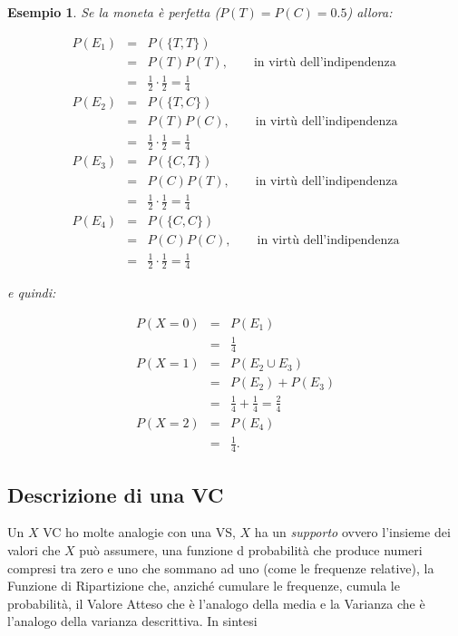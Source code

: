 \documentclass[
  11pt,
]{book}
\theoremstyle{mytheoremstyle}
\theoremstyle{mydefstyle}
\newtheorem{example}{{Esempio}}[section]
\begin{document}
\begin{example}
Se la moneta è perfetta (\(P(T)=P(C)=0.5\)) allora:

\begin{eqnarray*} 
P(E_1) &=& P(\{T,T\}) \\ 
    &=& P(T)P(T), \qquad \text{in virtù dell'indipendenza}\\
    &=& \frac 12 \cdot \frac 12  = \frac 14 \\
P(E_2)  &=& P(\{T,C\})\\
    &=& P(T)P(C), \qquad \text{in virtù dell'indipendenza}\\
    &=& \frac 12 \cdot \frac 12  = \frac 14 \\
P(E_3)  &=& P(\{C,T\})\\
    &=& P(C)P(T), \qquad \text{in virtù dell'indipendenza}\\
    &=& \frac 12 \cdot \frac 12  = \frac 14 \\
P(E_4)  &=& P(\{C,C\})\\
    &=& P(C)P(C), \qquad \text{in virtù dell'indipendenza}\\
    &=& \frac 12 \cdot \frac 12  = \frac 14 
\end{eqnarray*}

e quindi:

\begin{eqnarray*} 
P(X=0) &=& P(E_1) \\ 
    &=&\frac 14\\
P(X=1) &=& P(E_2\cup E_3)\\
    &=& P(E_2)+P(E_3)\\
    &=& \frac 14+\frac 14 = \frac 24\\
P(X=2) &=& P(E_4) \\ 
    &=&\frac 14.
\end{eqnarray*}
\end{example}

\subsection{Descrizione di una VC}\label{descrizione-di-una-vc}

Un \(X\) VC ho molte analogie con una VS, \(X\) ha un \emph{supporto}
ovvero l'insieme dei valori che \(X\) può assumere, una funzione d probabilità
che produce numeri compresi tra zero e uno che sommano ad uno (come le frequenze relative),
la Funzione di Ripartizione che, anziché cumulare le frequenze, cumula le probabilità,
il Valore Atteso che è l'analogo della media e la Varianza che è l'analogo della varianza
descrittiva. In sintesi
\end{document}
